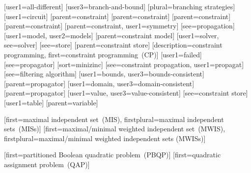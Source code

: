 [user1={all-different}]
[user3={branch-and-bound}]
[plural={branching strategies}]
[user1={circuit}]
[parent={constraint}]
[parent={constraint}]
[parent={constraint}]
[parent={constraint}]
%
        [parent={constraint}, user1={symmetry}]
[see={propagation}]
[user1={model}, user2={models}]
[parent={constraint model}]
[user1={solver}, see={solver}]
[see={store}]
[parent={constraint store}]
%
        [description={constraint programming},
         first={constraint programming~(CP)}]
[user1={failed}]
[see={propagator}]
[sort={minizinc}]
[see={constraint propagation}, user1={propagat}]
[see={filtering algorithm}]
[user1={bounds}, user3={bounds-consistent}]
[parent={propagator}]
[user1={domain}, user3={domain-consistent}]
[parent={propagator}]
[user1={value}, user3={value-consistent}]
[see={constraint store}]
[user1={table}]
[parent={variable}]


%
        [first={maximal independent set~(MIS)},
         firstplural={maximal independent sets~(MISs)}]
%
        [first={maximal/minimal weighted independent set~(MWIS)},
         firstplural={maximal/minimal weighted independent sets (MWISs)}]

%
        [first={partitioned Boolean quadratic problem~(PBQP)}]
%
        [first={quadratic assignment problem~(QAP)}]

